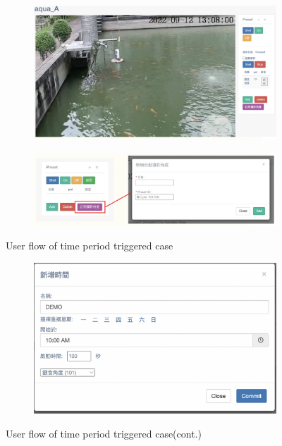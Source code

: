 \begin{figure}[H]
    \centering
    \begin{subfigure}{\textwidth}
        \includegraphics[width=\textwidth]{figsrc/time-userflow-a.png}
        \label{fig:time-userflow-a}
    \end{subfigure}

\medskip
    \begin{subfigure}{\textwidth}
        \includegraphics[width=\textwidth]{figsrc/time-userflow-b.png}
        \label{fig:time-userflow-b}
    \end{subfigure}
    \caption{User flow of time period triggered case}
\end{figure}

\begin{figure}[H]
    \ContinuedFloat
    \centering
    \begin{subfigure}{\textwidth}
        \includegraphics[width=\textwidth]{figsrc/time-userflow-c.png}
        \label{fig:time-userflow-c}
    \end{subfigure}

    \caption{User flow of time period triggered case(cont.)}
    \label{fig:time-userflow}
\end{figure}

